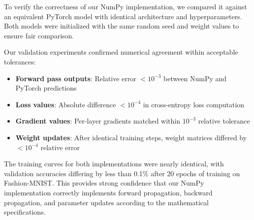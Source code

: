To verify the correctness of our NumPy implementation, we compared it against an equivalent PyTorch model with identical architecture and hyperparameters. Both models were initialized with the same random seed and weight values to ensure fair comparison.

Our validation experiments confirmed numerical agreement within acceptable tolerances:

\begin{itemize}
\item \textbf{Forward pass outputs}: Relative error $< 10^{-3}$ between NumPy and PyTorch predictions
\item \textbf{Loss values}: Absolute difference $< 10^{-4}$ in cross-entropy loss computation
\item \textbf{Gradient values}: Per-layer gradients matched within $10^{-3}$ relative tolerance
\item \textbf{Weight updates}: After identical training steps, weight matrices differed by $< 10^{-4}$ relative error
\end{itemize}

The training curves for both implementations were nearly identical, with validation accuracies differing by less than 0.1\% after 20 epochs of training on Fashion-MNIST. This provides strong confidence that our NumPy implementation correctly implements forward propagation, backward propagation, and parameter updates according to the mathematical specifications.

